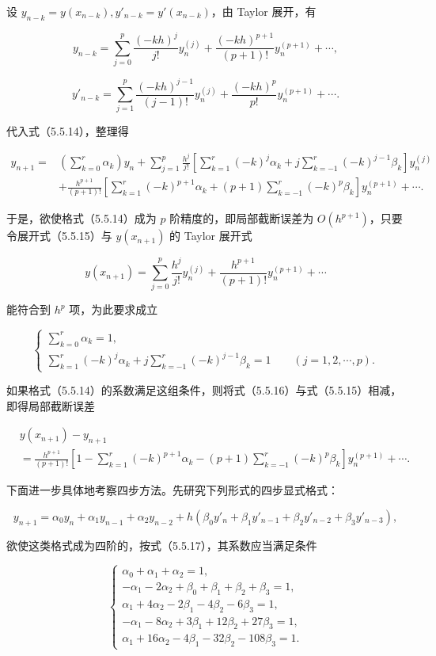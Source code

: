 \documentclass[
  10pt,
  fontset=fandol]{ctexart}
\begin{document}
设 \(y_{n-k}=y(x_{n-k}),y'_{n-k}=y'(x_{n-k})\)，由 Taylor 展开，有

\[
y_{n-k}=\sum_{j=0}^p\frac{(-kh)^j}{j!}y_n^{(j)}+\frac{(-kh)^{p+1}}{(p+1)!}y_n^{(p+1)}+\cdots,
\]

\[
y'_{n-k}=\sum_{j=1}^p\frac{(-kh)^{j-1}}{(j-1)!}y_n^{(j)}+\frac{(-kh)^p}{p!}y_n^{(p+1)}+\cdots.
\]

代入式（5.5.14），整理得

\[
\begin{aligned}
y_{n+1}={}&\left(\sum_{k=0}^r\alpha_k\right)y_n+\sum_{j=1}^p\frac{h^j}{j!}\left[\sum_{k=1}^r(-k)^j\alpha_k+j\sum_{k=-1}^r(-k)^{j-1}\beta_k\right]y_n^{(j)}\\
&+\frac{h^{p+1}}{(p+1)!}\left[\sum_{k=1}^r(-k)^{p+1}\alpha_k+(p+1)\sum_{k=-1}^r(-k)^p\beta_k\right]y_n^{(p+1)}+\cdots.
\end{aligned}
\tag{5.5.15}
\]

于是，欲使格式（5.5.14）成为 \(p\) 阶精度的，即局部截断误差为 \(O(h^{p+1})\)，只要令展开式（5.5.15）与 \(y(x_{n+1})\) 的 Taylor 展开式

\[
y(x_{n+1})=\sum_{j=0}^p\frac{h^j}{j!}y_n^{(j)}+\frac{h^{p+1}}{(p+1)!}y_n^{(p+1)}+\cdots
\tag{5.5.16}
\]

能符合到 \(h^p\) 项，为此要求成立

\[
\begin{cases}
\displaystyle\sum_{k=0}^r\alpha_k=1,\\[6pt]
\displaystyle\sum_{k=1}^r(-k)^j\alpha_k+j\sum_{k=-1}^r(-k)^{j-1}\beta_k=1\qquad(j=1,2,\cdots,p).
\end{cases}
\tag{5.5.17}
\]

如果格式（5.5.14）的系数满足这组条件，则将式（5.5.16）与式（5.5.15）相减，即得局部截断误差

\[
\begin{aligned}
&y(x_{n+1})-y_{n+1}\\
&=\frac{h^{p+1}}{(p+1)!}\left[1-\sum_{k=1}^r(-k)^{p+1}\alpha_k-(p+1)\sum_{k=-1}^r(-k)^p\beta_k\right]y_n^{(p+1)}+\cdots.
\end{aligned}
\tag{5.5.18}
\]

下面进一步具体地考察四步方法。先研究下列形式的四步显式格式：

\[
y_{n+1}=\alpha_0y_n+\alpha_1y_{n-1}+\alpha_2y_{n-2}+h(\beta_0y'_n+\beta_1y'_{n-1}+\beta_2y'_{n-2}+\beta_3y'_{n-3}),
\tag{5.5.19}
\]

欲使这类格式成为四阶的，按式（5.5.17），其系数应当满足条件

\[
\begin{cases}
\alpha_0+\alpha_1+\alpha_2=1,\\
-\alpha_1-2\alpha_2+\beta_0+\beta_1+\beta_2+\beta_3=1,\\
\alpha_1+4\alpha_2-2\beta_1-4\beta_2-6\beta_3=1,\\
-\alpha_1-8\alpha_2+3\beta_1+12\beta_2+27\beta_3=1,\\
\alpha_1+16\alpha_2-4\beta_1-32\beta_2-108\beta_3=1.
\end{cases}
\tag{5.5.20}
\]
\end{document}
